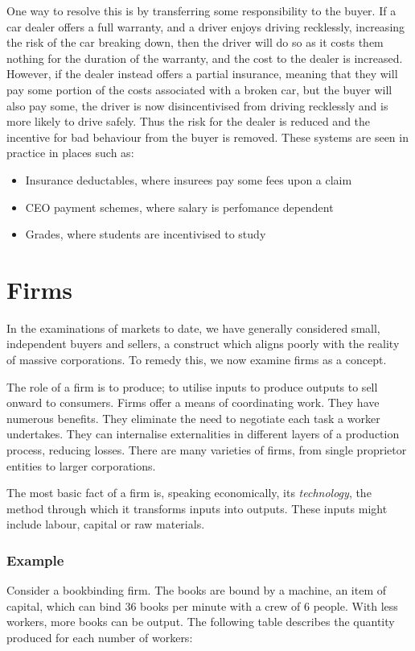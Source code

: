 \documentclass[12pt]{report}
\begin{document}
\bigskip
One way to resolve this is by transferring some responsibility to the buyer.
If a car dealer offers a full warranty, and a driver enjoys driving recklessly,
increasing the risk of the car breaking down, then the driver will do so as
it costs them nothing for the duration of the warranty, and the cost to the 
dealer is increased. However, if the dealer instead offers a partial insurance,
meaning that they will pay some portion of the costs associated with a broken
car, but the buyer will also pay some, the driver is now disincentivised from
driving recklessly and is more likely to drive safely. Thus the risk for the 
dealer is reduced and the incentive for bad behaviour from the buyer is 
removed. These systems are seen in practice in places such as:
\begin{itemize}
    \item Insurance deductables, where insurees pay some fees upon a claim
    \item CEO payment schemes, where salary is perfomance dependent
    \item Grades, where students are incentivised to study
\end{itemize}

\section*{Firms}
In the examinations of markets to date, we have generally considered small,
independent buyers and sellers, a construct which aligns poorly with the
reality of massive corporations. To remedy this, we now examine firms as a
concept.

\bigskip
The role of a firm is to produce; to utilise inputs to produce outputs to
sell onward to consumers. Firms offer a means of coordinating work. They have
numerous benefits. They eliminate the need to negotiate each task a worker
undertakes. They can internalise externalities in different layers of a 
production process, reducing losses. There are many varieties of firms, from
single proprietor entities to larger corporations.

\bigskip
The most basic fact of a firm is, speaking economically, its 
\textit{technology}, the method through which it transforms inputs into 
outputs. These inputs might include labour, capital or raw materials.

\subsubsection*{Example}
Consider a bookbinding firm. The books are bound by a machine, an item of 
capital, which can bind 36 books per minute with a crew of 6 people. With less
workers, more books can be output. The following table describes the quantity
produced for each number of workers:
\end{document}
